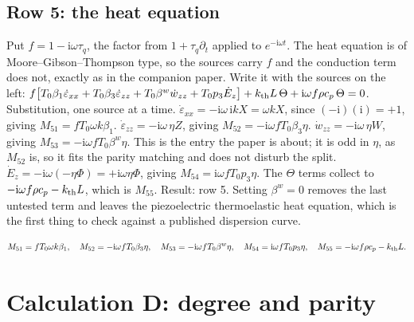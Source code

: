 \documentclass[11pt]{article}
\makeatletter
\newif\ifshowworked
\newenvironment{worked}{%
  \ifshowworked\par\smallskip\noindent\textit{Working.}\par\smallskip\else
  \setbox\z@\vbox\bgroup\fi}{\ifshowworked\par\smallskip\else\egroup\fi}
\newcommand{\ii}{\mathrm{i}}
\makeatother
\begin{document}
\subsection*{Row 5: the heat equation}

\begin{worked}
Put $f=1-\ii\omega\tau_q$, the factor from $1+\tau_q\partial_t$ applied to $e^{-\ii\omega t}$. The heat
equation is of Moore--Gibson--Thompson type, so the sources carry $f$ and the conduction term does not,
exactly as in the companion paper. Write it with the sources on the left:
$f\bigl[T_0\beta_1\dot\varepsilon_{xx}+T_0\beta_3\dot\varepsilon_{zz}+T_0\beta^{w}\dot w_{zz}
+T_0p_3\dot E_z\bigr]+k_{\rm th}L\,\Theta+\ii\omega f\rho c_p\,\Theta=0$.
Substitution, one source at a time.
$\dot\varepsilon_{xx}=-\ii\omega\,\ii kX=\omega kX$, since $(-\ii)(\ii)=+1$, giving
$M_{51}=fT_0\omega k\beta_1$.
$\dot\varepsilon_{zz}=-\ii\omega\,\eta Z$, giving $M_{52}=-\ii\omega fT_0\beta_3\eta$.
$\dot w_{zz}=-\ii\omega\,\eta W$, giving $M_{53}=-\ii\omega fT_0\beta^{w}\eta$. This is the entry the
paper is about; it is odd in $\eta$, as $M_{52}$ is, so it fits the parity matching and does not disturb
the split.
$\dot E_z=-\ii\omega(-\eta\Phi)=+\ii\omega\eta\Phi$, giving $M_{54}=\ii\omega fT_0p_3\eta$.
The $\Theta$ terms collect to $-\ii\omega f\rho c_p-k_{\rm th}L$, which is $M_{55}$.
Result: row 5. Setting $\beta^{w}=0$ removes the last untested term and leaves the piezoelectric
thermoelastic heat equation, which is the first thing to check against a published dispersion curve.
\end{worked}

\begin{equation}
M_{51}=fT_0\omega k\beta_1,\quad
M_{52}=-\ii\omega fT_0\beta_3\eta,\quad
M_{53}=-\ii\omega fT_0\beta^{w}\eta,\quad
M_{54}=\ii\omega fT_0p_3\eta,\quad
M_{55}=-\ii\omega f\rho c_p-k_{\rm th}L .
\end{equation}

\section{Calculation D: degree and parity}\label{sec:calcD}
\end{document}
